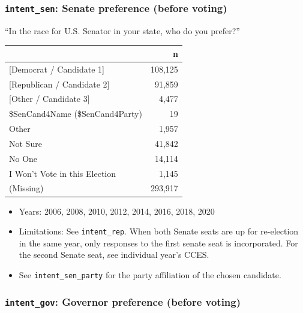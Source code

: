 \documentclass[10pt,article,oneside]{memoir}
\theoremstyle{definition}
\begin{document}
\hypertarget{intent_sen-senate-preference-before-voting}{%
\subsubsection{\texorpdfstring{\texttt{intent\_sen}: Senate preference
(before
voting)}{intent\_sen: Senate preference (before voting)}}\label{intent_sen-senate-preference-before-voting}}

``In the race for U.S. Senator in your state, who do you prefer?''

\begin{table}[H]
\centering
\begin{tabular}[t]{lr}
\toprule
 & n\\
\midrule
{}{[Democrat / Candidate 1]} & 108,125\\
{}{[Republican / Candidate 2]} & 91,859\\
{}{[Other / Candidate 3]} & 4,477\\
\$SenCand4Name (\$SenCand4Party) & 19\\
Other & 1,957\\
Not Sure & 41,842\\
No One & 14,114\\
I Won't Vote in this Election & 1,145\\
(Missing) & 293,917\\
\bottomrule
\end{tabular}
\end{table}

\begin{itemize}
\tightlist
\item
  Years: 2006, 2008, 2010, 2012, 2014, 2016, 2018, 2020
\item
  Limitations: See \texttt{intent\_rep}. When both Senate seats are up
  for re-election in the same year, only responses to the first senate
  seat is incorporated. For the second Senate seat, see individual
  year's CCES.
\item
  See \texttt{intent\_sen\_party} for the party affiliation of the
  chosen candidate.
\end{itemize}

\hypertarget{intent_gov-governor-preference-before-voting}{%
\subsubsection{\texorpdfstring{\texttt{intent\_gov}: Governor preference
(before
voting)}{intent\_gov: Governor preference (before voting)}}\label{intent_gov-governor-preference-before-voting}}
\end{document}
